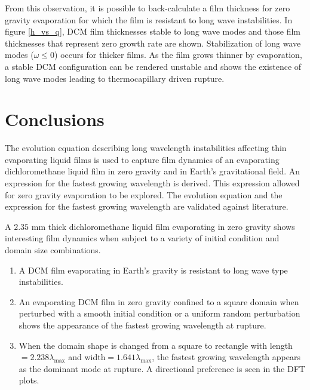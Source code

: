 \documentclass[a4paper,12pt]{article}
\begin{document}

From this observation, it is possible to back-calculate a film thickness for zero gravity evaporation for which the film is resistant to long wave instabilities. In figure \ref{h_vs_q}, DCM film thicknesses stable to long wave modes and those film thicknesses that represent zero growth rate are shown. Stabilization of long wave modes ($\omega \leq 0$) occurs for thicker films. As the film grows thinner by evaporation, a stable DCM configuration can be rendered unstable and shows the existence of long wave modes leading to thermocapillary driven rupture.

\section{Conclusions}

The evolution equation describing long wavelength instabilities affecting thin evaporating liquid films is used to capture film dynamics of an evaporating dichloromethane liquid film in zero gravity and in Earth's gravitational field. An expression for the fastest growing wavelength is derived. This expression allowed for zero gravity evaporation to be explored. The evolution equation and the expression for the fastest growing wavelength are validated against literature.

A $2.35$ mm thick dichloromethane liquid film evaporating in zero gravity shows interesting film dynamics when subject to a variety of initial condition and domain size combinations.

\begin{enumerate}
\item A DCM film evaporating in Earth's gravity is resistant to long wave type instabilities.
\item An evaporating DCM film in zero gravity confined to a square domain when perturbed with a smooth initial condition or a uniform random perturbation shows the appearance of the fastest growing wavelength at rupture.
\item When the domain shape is changed from a square to rectangle with length$=2.238\lambda_\text{max}$ and width$=1.641\lambda_\text{max}$, the fastest growing wavelength appears as the dominant mode at rupture. A directional preference is seen in the DFT plots.
\end{enumerate}
\end{document}
